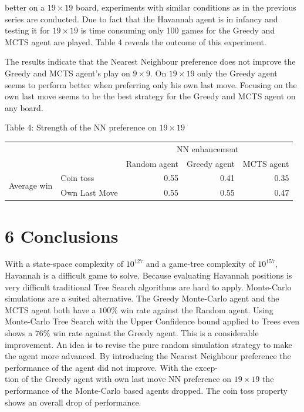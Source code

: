 \documentclass[10pt]{article}
\begin{document}
better on a $19 \times 19$ board, experiments with similar conditions as in the previous series are conducted. Due to fact that the Havannah agent is in infancy and testing it for $19 \times 19$ is time consuming only 100 games for the Greedy and MCTS agent are played. Table 4 reveals the outcome of this experiment.

The results indicate that the Nearest Neighbour preference does not improve the Greedy and MCTS agent's play on $9 \times 9$. On $19 \times 19$ only the Greedy agent seems to perform better when preferring only his own last move. Focusing on the own last move seems to be the best strategy for the Greedy and MCTS agent on any board.

Table 4: Strength of the NN preference on $19 \times 19$

\begin{center}
\begin{tabular}{llrrr}
\hline
 &  & \multicolumn{3}{c}{NN enhancement} \\
\cline { 3 - 5 }
 &  & Random agent & Greedy agent & MCTS agent \\
\hline
\multirow{2}{*}{Average win} & Coin toss & 0.55 & 0.41 & 0.35 \\
 & Own Last Move & 0.55 & 0.55 & 0.47 \\
\hline
\end{tabular}
\end{center}

\section*{6 Conclusions}
With a state-space complexity of $10^{127}$ and a game-tree complexity of $10^{157}$, Havannah is a difficult game to solve. Because evaluating Havannah positions is very difficult traditional Tree Search algorithms are hard to apply. Monte-Carlo simulations are a suited alternative. The Greedy Monte-Carlo agent and the MCTS agent both have a $100 \%$ win rate against the Random agent. Using Monte-Carlo Tree Search with the Upper Confidence bound applied to Trees even shows a $76 \%$ win rate against the Greedy agent. This is a considerable improvement. An idea is to revise the pure random simulation strategy to make the agent more advanced. By introducing the Nearest Neighbour preference the performance of the agent did not improve. With the excep-\\
tion of the Greedy agent with own last move NN preference on $19 \times 19$ the performance of the Monte-Carlo based agents dropped. The coin toss property shows an overall drop of performance.
\end{document}

